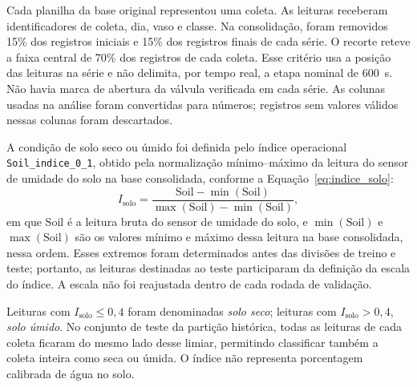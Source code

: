 Cada planilha da base original representou uma coleta. As leituras receberam
identificadores de coleta, dia, vaso e classe. Na consolidação, foram removidos
15\% dos registros iniciais e 15\% dos registros finais de cada série. O
recorte reteve a faixa central de 70\% dos registros de cada coleta. Esse
critério usa a posição das leituras na série e não delimita, por tempo real,
a etapa nominal de 600~s. Não havia marca de abertura da válvula verificada
em cada série. As colunas usadas na análise foram convertidas para números;
registros sem valores válidos nessas colunas foram descartados.

A condição de solo seco ou úmido foi definida pelo índice operacional
\texttt{Soil\_indice\_0\_1}, obtido pela normalização mínimo--máximo da leitura
do sensor de umidade do solo na base consolidada, conforme a
Equação~\eqref{eq:indice_solo}:
\begin{equation}
    I_{\mathrm{solo}} =
    \frac{\mathrm{Soil}-\min(\mathrm{Soil})}
         {\max(\mathrm{Soil})-\min(\mathrm{Soil})},
    \label{eq:indice_solo}
\end{equation}
em que $\mathrm{Soil}$ é a leitura bruta do sensor de umidade do solo, e
$\min(\mathrm{Soil})$ e $\max(\mathrm{Soil})$ são os valores
mínimo e máximo dessa leitura na base consolidada, nessa ordem.
Esses extremos foram determinados antes das divisões de treino e teste;
portanto, as leituras destinadas ao teste participaram da
definição da escala do índice. A escala não foi reajustada dentro
de cada rodada de validação.

Leituras com $I_{\mathrm{solo}}\leq 0{,}4$ foram denominadas \emph{solo seco};
leituras com $I_{\mathrm{solo}}>0{,}4$, \emph{solo úmido}. No conjunto de
teste da partição histórica, todas as leituras de cada coleta ficaram do mesmo lado desse limiar,
permitindo classificar também a coleta inteira como seca ou úmida. O índice não
representa porcentagem calibrada de água no solo.

